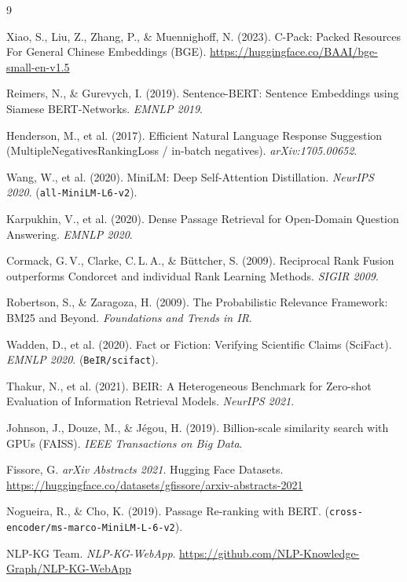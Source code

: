 \documentclass[12pt,a4paper]{article}
\begin{document}
\newpage
\begin{thebibliography}{9}

 Xiao, S., Liu, Z., Zhang, P., \& Muennighoff, N. (2023). C-Pack: Packed Resources For General Chinese Embeddings (BGE). \url{https://huggingface.co/BAAI/bge-small-en-v1.5}

 Reimers, N., \& Gurevych, I. (2019). Sentence-BERT: Sentence Embeddings using Siamese BERT-Networks. \textit{EMNLP 2019}.

 Henderson, M., et al. (2017). Efficient Natural Language Response Suggestion (MultipleNegativesRankingLoss / in-batch negatives). \textit{arXiv:1705.00652}.

 Wang, W., et al. (2020). MiniLM: Deep Self-Attention Distillation. \textit{NeurIPS 2020}. (\texttt{all-MiniLM-L6-v2}).

 Karpukhin, V., et al. (2020). Dense Passage Retrieval for Open-Domain Question Answering. \textit{EMNLP 2020}.

 Cormack, G.\,V., Clarke, C.\,L.\,A., \& B\"uttcher, S. (2009). Reciprocal Rank Fusion outperforms Condorcet and individual Rank Learning Methods. \textit{SIGIR 2009}.

 Robertson, S., \& Zaragoza, H. (2009). The Probabilistic Relevance Framework: BM25 and Beyond. \textit{Foundations and Trends in IR}.

 Wadden, D., et al. (2020). Fact or Fiction: Verifying Scientific Claims (SciFact). \textit{EMNLP 2020}. (\texttt{BeIR/scifact}).

 Thakur, N., et al. (2021). BEIR: A Heterogeneous Benchmark for Zero-shot Evaluation of Information Retrieval Models. \textit{NeurIPS 2021}.

 Johnson, J., Douze, M., \& J\'egou, H. (2019). Billion-scale similarity search with GPUs (FAISS). \textit{IEEE Transactions on Big Data}.

 Fissore, G. \textit{arXiv Abstracts 2021}. Hugging Face Datasets. \url{https://huggingface.co/datasets/gfissore/arxiv-abstracts-2021}

 Nogueira, R., \& Cho, K. (2019). Passage Re-ranking with BERT. (\texttt{cross-encoder/ms-marco-MiniLM-L-6-v2}).

 NLP-KG Team. \textit{NLP-KG-WebApp}. \url{https://github.com/NLP-Knowledge-Graph/NLP-KG-WebApp}

\end{thebibliography}
\end{document}
